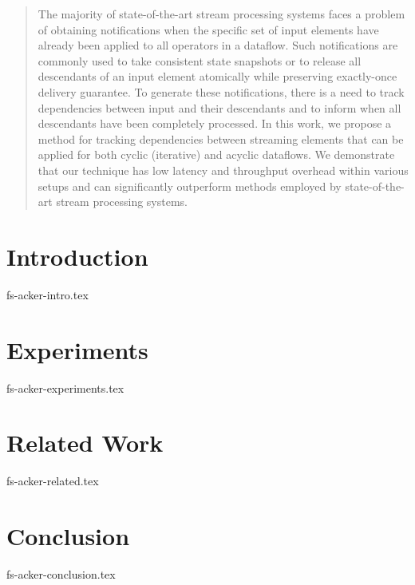 \documentclass[sigconf]{acmart}
\theoremstyle{remark}
\begin{document}
\begin{abstract}
The majority of state-of-the-art stream processing systems faces a problem of obtaining notifications when the specific set of input elements have already been applied to all operators in a dataflow. Such notifications are commonly used to take consistent state snapshots or to release all descendants of an input element atomically while preserving exactly-once delivery guarantee. To generate these notifications, there is a need to track dependencies between input and their descendants and to inform when all descendants have been completely processed. In this work, we propose a method for tracking dependencies between streaming elements that can be applied for both cyclic (iterative) and acyclic dataflows. We demonstrate that our technique has low latency and throughput overhead within various setups and can significantly outperform methods employed by state-of-the-art stream processing systems.



\end{abstract}


\maketitle

\thispagestyle{empty}

\section {Introduction}
 {fs-acker-intro.tex}

\section {Experiments}
 {fs-acker-experiments.tex}

\section{Related Work}
 {fs-acker-related.tex}


\section {Conclusion}
 {fs-acker-conclusion.tex}



\end{document}
